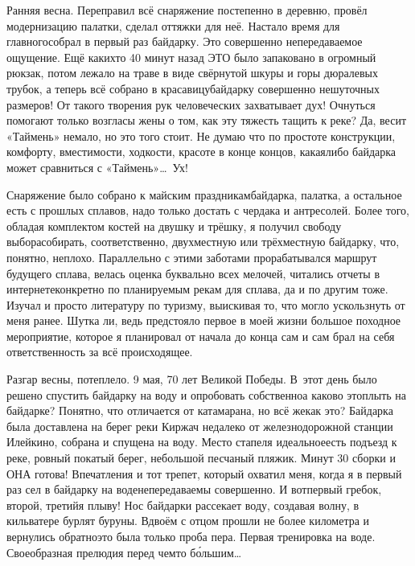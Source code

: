 Ранняя весна. Переправил всё снаряжение постепенно в деревню, провёл модернизацию палатки, сделал оттяжки для неё. Настало время для главного\mdash собрал в первый раз байдарку. Это совершенно непередаваемое ощущение. Ещё каких\sdash то 40 минут назад ЭТО было запаковано в огромный рюкзак, потом лежало на траве в виде свёрнутой шкуры и горы дюралевых трубок, а теперь всё собрано в красавицу\sdash байдарку совершенно нешуточных размеров! От такого творения рук человеческих захватывает дух! Очнуться помогают только возгласы жены о том, как эту тяжесть тащить к реке? Да, весит «Таймень» немало, но это того стоит. Не думаю что по простоте конструкции, комфорту, вместимости, ходкости, красоте в конце концов, какая\sdash либо байдарка может сравниться с «Таймень»\ldots~Ух! 

Снаряжение было собрано к майским праздникам\mdash байдарка, палатка, а остальное есть с прошлых сплавов, надо только достать с чердака и антресолей. Более того, обладая комплектом костей на двушку и трёшку, я получил свободу выбора\mdash собирать, соответственно, двухместную или трёхместную байдарку, что, понятно, неплохо. Параллельно с этими заботами прорабатывался маршрут будущего сплава, велась оценка буквально всех мелочей, читались отчеты в интернете\mdash конкретно по планируемым рекам для сплава, да и по другим тоже. Изучал и просто литературу по туризму, выискивая то, что могло ускользнуть от меня ранее. Шутка ли, ведь предстояло первое в моей жизни большое походное мероприятие, которое я планировал от начала до конца сам и сам брал на себя ответственность за всё происходящее.

Разгар весны, потеплело. 9 мая, 70 лет Великой Победы. В~этот день было решено спустить байдарку на воду и опробовать собственно\mdash а каково это\mdash плыть на байдарке? Понятно, что отличается от катамарана, но всё же\mdash как это? Байдарка была доставлена на берег реки Киржач недалеко от железнодорожной станции Илейкино, собрана и спущена на воду. Место стапеля идеальное\mdash есть подъезд к реке, ровный покатый берег, небольшой песчаный пляжик. Минут 30 сборки и ОНА готова! Впечатления и тот трепет, который охватил меня, когда я в первый раз сел в байдарку на воде\mdash непередаваемы совершенно. И вот\mdash первый гребок, второй, третий\mdash я плыву! Нос байдарки рассекает воду, создавая волну, в кильватере бурлят буруны. Вдвоём с отцом прошли не более километра и вернулись обратно\mdash это была только проба пера. Первая тренировка на воде. Своеобразная прелюдия перед чем\sdash то б\'{о}льшим\ldots
 

